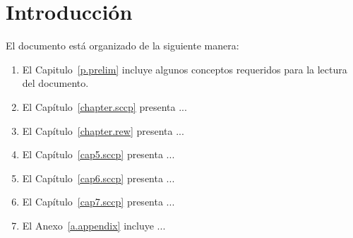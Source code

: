 
\chapter{Introducci\'on}
\label{cha.intro}

El documento est\'a organizado de la siguiente manera:

\begin{enumerate}
   \item El Capitulo~\ref{p.prelim} incluye algunos conceptos requeridos
	para la lectura del documento.

   \item El Cap\'itulo~\ref{chapter.sccp} presenta ...
   \item El Cap\'itulo~\ref{chapter.rew} presenta ...
   \item El Cap\'itulo~\ref{cap5.sccp} presenta ...
   \item El Cap\'itulo~\ref{cap6.sccp} presenta ...
   \item El Cap\'itulo~\ref{cap7.sccp} presenta ...

   \item El Anexo~\ref{a.appendix} incluye ...
\end{enumerate}
